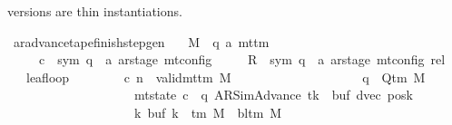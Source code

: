 \begin{isabellebody}
\begin{isamarkuptext}
  versions are thin instantiations.%
\end{isamarkuptext}\isamarkuptrue%
\isamarkupfalse%
\ ar{\isacharunderscore}{\kern0pt}advance{\isacharunderscore}{\kern0pt}tape{\isacharunderscore}{\kern0pt}finish{\isacharunderscore}{\kern0pt}step{\isacharunderscore}{\kern0pt}gen{\isacharcolon}{\kern0pt}\isanewline
\ \ \ M\ {\isacharcolon}{\kern0pt}{\isacharcolon}{\kern0pt}\ {\isachardoublequoteopen}{\isacharparenleft}{\kern0pt}{\isacharprime}{\kern0pt}q{\isacharcomma}{\kern0pt}\ {\isacharprime}{\kern0pt}a{\isacharparenright}{\kern0pt}\ mttm{\isachardoublequoteclose}\isanewline
\ \ \ \ \ c{}\ {\isacharcolon}{\kern0pt}{\isacharcolon}{\kern0pt}\ {\isachardoublequoteopen}{\isacharparenleft}{\kern0pt}sym{}{\isacharcomma}{\kern0pt}\ {\isacharprime}{\kern0pt}q\ {\isasymtimes}\ {\isacharprime}{\kern0pt}a\ ar{\isacharunderscore}{\kern0pt}stage{\isacharparenright}{\kern0pt}\ mt{\isacharunderscore}{\kern0pt}config{\isachardoublequoteclose}\isanewline
\ \ \ \ \ R{\isacharprime}{\kern0pt}\ {\isacharcolon}{\kern0pt}{\isacharcolon}{\kern0pt}\ {\isachardoublequoteopen}{\isacharparenleft}{\kern0pt}sym{}{\isacharcomma}{\kern0pt}\ {\isacharprime}{\kern0pt}q\ {\isasymtimes}\ {\isacharprime}{\kern0pt}a\ ar{\isacharunderscore}{\kern0pt}stage{\isacharparenright}{\kern0pt}\ mt{\isacharunderscore}{\kern0pt}config\ rel{\isachardoublequoteclose}\isanewline
\ \ \ leaf{\isacharunderscore}{\kern0pt}loop{\isacharcolon}{\kern0pt}\isanewline
\ \ \ \ \ \ \ \ {\isachardoublequoteopen}{\isasymAnd}c{}{\isacharprime}{\kern0pt}\ n{\isachardot}{\kern0pt}\ {\isasymlbrakk}\ valid{\isacharunderscore}{\kern0pt}mttm\ M{\isacharsemicolon}{\kern0pt}\isanewline
\ \ \ \ \ \ \ \ \ \ \ \ \ \ \ \ \ \ \ \ q\ {\isasymin}\ Q{\isacharunderscore}{\kern0pt}tm\ M{\isacharsemicolon}{\kern0pt}\isanewline
\ \ \ \ \ \ \ \ \ \ \ \ \ \ \ \ \ \ \ \ mt{\isacharunderscore}{\kern0pt}state\ c{}{\isacharprime}{\kern0pt}\ {\isacharequal}{\kern0pt}\ {\isacharparenleft}{\kern0pt}q{\isacharcomma}{\kern0pt}\ AR{\isacharunderscore}{\kern0pt}SimAdvance{\isacharcomma}{\kern0pt}\ tk{\isacharcomma}{\kern0pt}\ {}{\isacharcomma}{\kern0pt}\ buf{\isacharcomma}{\kern0pt}\ dvec{\isacharcomma}{\kern0pt}\ posk{\isacharparenright}{\kern0pt}{\isacharsemicolon}{\kern0pt}\isanewline
\ \ \ \ \ \ \ \ \ \ \ \ \ \ \ \ \ \ \ \ {\isasymforall}k{\isachardot}{\kern0pt}\ buf\ k\ {\isasymin}\ {\isasymGamma}{\isacharunderscore}{\kern0pt}tm\ M\ {\isasymunion}\ {\isacharbraceleft}{\kern0pt}bl{\isacharunderscore}{\kern0pt}tm\ M{\isacharbraceright}{\kern0pt}{\isacharsemicolon}{\kern0pt}\isanewline

\end{isabellebody}
